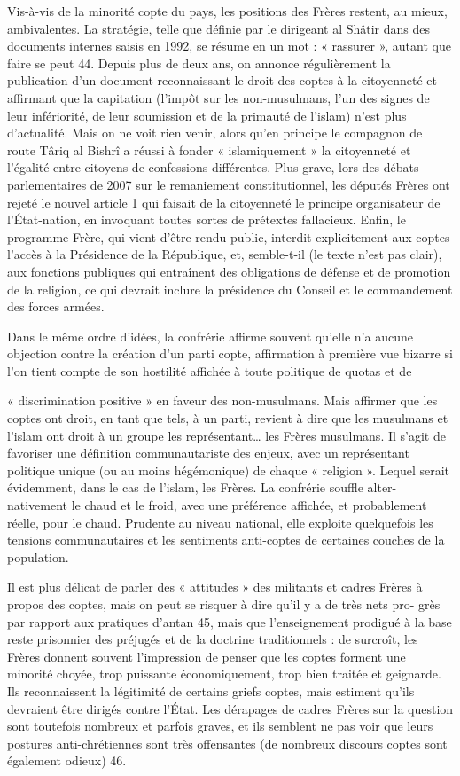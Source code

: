  
Vis-à-vis de la minorité copte du pays, les positions des Frères
restent, au mieux, ambivalentes. La stratégie, telle que définie par le
dirigeant al Shâtir dans des documents internes saisis en 1992, se
résume en un mot : « rassurer », autant que faire se peut 44. Depuis
plus de deux ans, on annonce régulièrement la publication d'un document
reconnaissant le droit des coptes à la citoyenneté et affirmant que la
capitation (l'impôt sur les non-musulmans, l'un des signes de leur
infériorité, de leur soumission et de la primauté de l'islam) n'est plus
d'actualité. Mais on ne voit rien venir, alors qu'en principe le
compagnon de route Târiq al Bishrî a réussi à fonder « islamiquement »
la citoyenneté et l'égalité entre citoyens de confessions différentes.
Plus grave, lors des débats parlementaires de 2007 sur le remaniement
constitutionnel, les députés Frères ont rejeté le nouvel article 1 qui
faisait de la citoyenneté le principe organisateur de l'État-nation, en
invoquant toutes sortes de prétextes fallacieux. Enfin, le programme
Frère, qui vient d'être rendu public, interdit explicitement aux coptes
l'accès à la Présidence de la République, et, semble-t-il (le texte
n'est pas clair), aux fonctions publiques qui entraînent des obligations
de défense et de promotion de la religion, ce qui devrait inclure la
présidence du Conseil et le commandement des forces armées.

Dans le même ordre d'idées, la confrérie affirme souvent qu'elle n'a
aucune objection contre la création d'un parti copte, affirmation à
première vue bizarre si l'on tient compte de son hostilité affichée à
toute politique de quotas et de

« discrimination positive » en faveur des non-musulmans. Mais affirmer
que les coptes ont droit, en tant que tels, à un parti, revient à dire
que les musulmans et l'islam ont droit à un groupe les
représentant\ldots{} les Frères musulmans. Il s'agit de favoriser une
définition communautariste des enjeux, avec un représentant politique
unique (ou au moins hégémonique) de chaque « religion ». Lequel serait
évidemment, dans le cas de l'islam, les Frères. La confrérie souffle
alter- nativement le chaud et le froid, avec une préférence affichée, et
probablement réelle, pour le chaud. Prudente au niveau national, elle
exploite quelquefois les tensions communautaires et les sentiments
anti-coptes de certaines couches de la population.

Il est plus délicat de parler des « attitudes » des militants et cadres
Frères à propos des coptes, mais on peut se risquer à dire qu'il y a de
très nets pro- grès par rapport aux pratiques d'antan 45, mais que
l'enseignement prodigué à la base reste prisonnier des préjugés et de la
doctrine traditionnels : de surcroît, les Frères donnent souvent
l'impression de penser que les coptes forment une minorité choyée, trop
puissante économiquement, trop bien traitée et geignarde. Ils
reconnaissent la légitimité de certains griefs coptes, mais estiment
qu'ils devraient être dirigés contre l'État. Les dérapages de cadres
Frères sur la question sont toutefois nombreux et parfois graves, et ils
semblent ne pas voir que leurs postures anti-chrétiennes sont très
offensantes (de nombreux discours coptes sont également odieux) 46.
 

